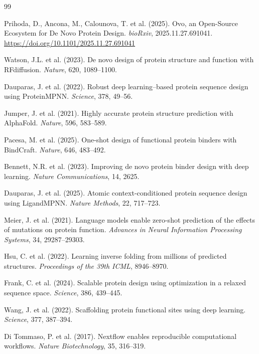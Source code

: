 \documentclass[10pt,a4paper,twocolumn]{article}
\begin{document}
\begin{thebibliography}{99}

Prihoda, D., Ancona, M., Calounova, T. et al. (2025).
Ovo, an Open-Source Ecosystem for De Novo Protein Design.
\textit{bioRxiv}, 2025.11.27.691041.
\url{https://doi.org/10.1101/2025.11.27.691041}

Watson, J.L. et al. (2023).
De novo design of protein structure and function with RFdiffusion.
\textit{Nature}, 620, 1089--1100.

Dauparas, J. et al. (2022).
Robust deep learning--based protein sequence design using ProteinMPNN.
\textit{Science}, 378, 49--56.

Jumper, J. et al. (2021).
Highly accurate protein structure prediction with AlphaFold.
\textit{Nature}, 596, 583--589.

Pacesa, M. et al. (2025).
One-shot design of functional protein binders with BindCraft.
\textit{Nature}, 646, 483--492.

Bennett, N.R. et al. (2023).
Improving de novo protein binder design with deep learning.
\textit{Nature Communications}, 14, 2625.

Dauparas, J. et al. (2025).
Atomic context-conditioned protein sequence design using LigandMPNN.
\textit{Nature Methods}, 22, 717--723.

Meier, J. et al. (2021).
Language models enable zero-shot prediction of the effects of mutations on protein function.
\textit{Advances in Neural Information Processing Systems}, 34, 29287--29303.

Hsu, C. et al. (2022).
Learning inverse folding from millions of predicted structures.
\textit{Proceedings of the 39th ICML}, 8946--8970.

Frank, C. et al. (2024).
Scalable protein design using optimization in a relaxed sequence space.
\textit{Science}, 386, 439--445.

Wang, J. et al. (2022).
Scaffolding protein functional sites using deep learning.
\textit{Science}, 377, 387--394.

Di Tommaso, P. et al. (2017).
Nextflow enables reproducible computational workflows.
\textit{Nature Biotechnology}, 35, 316--319.

\end{thebibliography}
\end{document}
